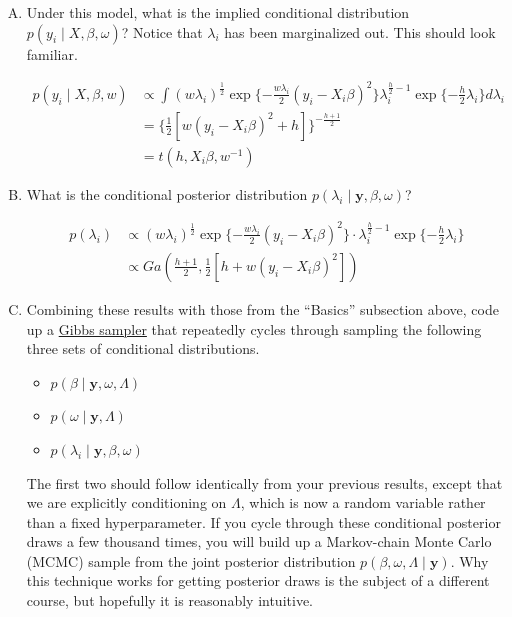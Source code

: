 \documentclass[11pt]{article}
\newcommand{\by}{\textbf{y}}
\newcommand{\half}{\frac{1}{2}}
\begin{document}
\begin{enumerate}[(A)]


\item Under this model, what is the implied conditional distribution $p(y_i \mid X, \beta, \omega)$?  Notice that $\lambda_i$ has been marginalized out.  This should look familiar.

\begin{align*}
    p(y_i \mid X,\beta,w) &\propto \int (w\lambda_i)^\half \exp\{-\frac{w\lambda_i}{2} (y_i - X_i\beta)^2\} \lambda_i^{\frac{h}{2}-1} \exp\{-\frac{h}{2}\lambda_i\}  d\lambda_i \\
    &= \{\half [w(y_i-X_i\beta)^2 + h] \}^{-\frac{h+1}{2}} \\
    &= t(h,X_i\beta,w^{-1})
\end{align*}

\item What is the conditional posterior distribution $p(\lambda_i \mid \by, \beta, \omega)$?

\begin{align*}
    p(\lambda_i) &\propto (w\lambda_i)^{\half} \exp\{-\frac{w\lambda_i}{2} (y_i - X_i\beta)^2\} \cdot \lambda_i^{\frac{h}{2}-1} \exp\{-\frac{h}{2}\lambda_i\} \\
    &\propto Ga\left(\frac{h+1}{2}, \half [h + w(y_i - X_i\beta)^2]\right)
\end{align*}

\item Combining these results with those from the ``Basics'' subsection above, code up a \href{http://en.wikipedia.org/wiki/Gibbs_sampling}{Gibbs sampler} that repeatedly cycles through sampling the following three sets of conditional distributions.
\begin{itemize}
\item $p(\beta \mid \by, \omega, \Lambda)$
\item $p(\omega \mid \by, \Lambda)$
\item $p(\lambda_i \mid \by, \beta, \omega)$
\end{itemize}
The first two should follow identically from your previous results, except that we are explicitly conditioning on $\Lambda$, which is now a random variable rather than a fixed hyperparameter.  If you cycle through these conditional posterior draws a few thousand times, you will build up a Markov-chain Monte Carlo (MCMC) sample from the joint posterior distribution $p(\beta, \omega, \Lambda \mid \by)$.  Why this technique works for getting posterior draws is the subject of a different course, but hopefully it is reasonably intuitive.


\end{enumerate}
\end{document}

